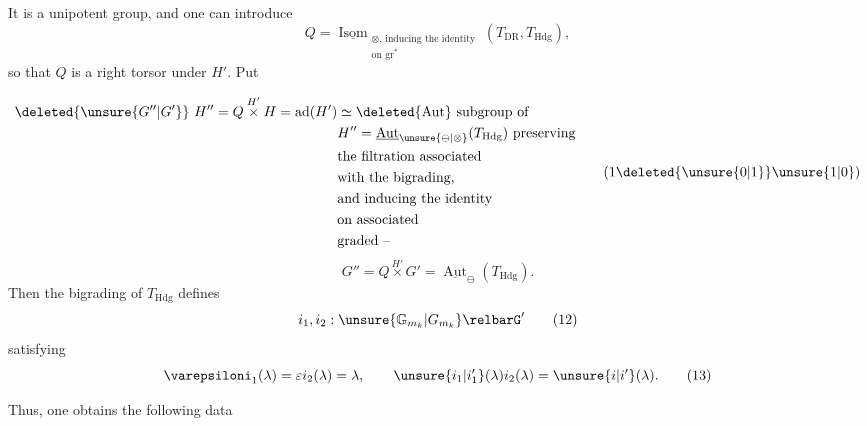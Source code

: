 \begingroup\makeatletter\tagsleft@true\makeatother
It is a unipotent group, and one can introduce
\[
Q=\underline{\operatorname{Isom}}_{\substack{\otimes,\,\text{inducing the identity}\\\text{on }\operatorname{gr}^{*}}}(T_{\mathrm{DR}},T_{\mathrm{Hdg}}),\tag*{(9)}
\]
so that $Q$ is a right torsor under $H'$. Put

\reversemarginpar
{}
\normalmarginpar
\[
\begin{aligned}
\deleted{\unsure{G''|G'}}\ H''=Q\overset{H'}{\times}H=\operatorname{ad}(H')&\simeq\deleted{\operatorname{Aut}}\ \text{subgroup of}\\
&H''=\underline{\operatorname{Aut}}_{\unsure{\ominus|\otimes}}(T_{\mathrm{Hdg}})\ \text{preserving}\\
&\text{the filtration associated}\\
&\text{with the bigrading,}\\
&\text{and inducing the identity}\\
&\text{on associated}\\
&\text{graded --}
\end{aligned}\tag*{(1\deleted{\unsure{0|1}}\unsure{1|0})}
\]
\[
G''=Q\overset{H'}{\times}G'=\underline{\operatorname{Aut}}_{\ominus}(T_{\mathrm{Hdg}}).\tag*{(10)}
\]
Then the bigrading of $T_{\mathrm{Hdg}}$ defines
\[
i_1,i_2:\unsure{\mathbb{G}_{m_k}|G_{m_k}}\relbarG'\tag*{(12)}
\]
satisfying
\[
\varepsiloni_1(\lambda)=\varepsilon i_2(\lambda)=\lambda,\qquad \unsure{i_1|i'_1}(\lambda)i_2(\lambda)=\unsure{i|i'}(\lambda).\tag*{(13)}
\]

Thus, one obtains the following data

